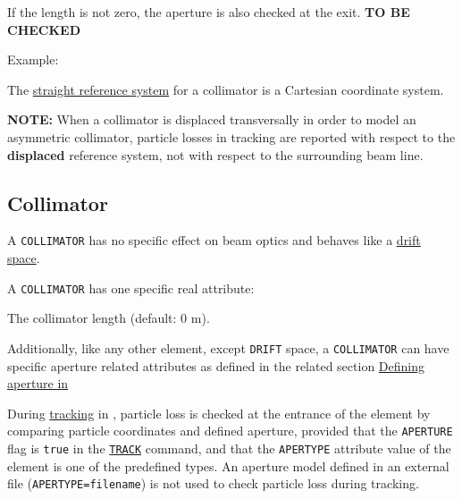 {\begin{5.02.04}
If the length is not zero, the aperture is also checked at the
exit. \textbf{ TO BE CHECKED } 

Example: 

The \hyperref[subsec:local_straight]{straight reference system} for a
collimator is a Cartesian coordinate system.  

\textbf{NOTE:} When a collimator is displaced transversally in order to
model an asymmetric collimator, particle losses in tracking are
reported with respect to the \textbf{displaced} reference system, not
with respect to the surrounding beam line.

\end{5.02.04}

\begin{5.02.05}
\section{Collimator}
\label{sec:collimator}

A {\tt COLLIMATOR} has no specific effect on beam optics and behaves like a
\hyperref[sec:drift]{drift space}. 



A {\tt COLLIMATOR} has one specific real attribute: 
\begin{madlist}
	 The collimator length (default: 0 m). 
\end{madlist}

Additionally, like any other element, except {\tt DRIFT} space, 
a {\tt COLLIMATOR} can have specific aperture related attributes 
as defined in the related section \hyperref[sec:def_aper]{Defining 
aperture in \madx}


During \hyperref[chap:thin_track]{tracking} in \madx, particle loss 
is checked at the entrance of the element by comparing particle coordinates 
and defined aperture, provided that the {\tt APERTURE} flag is {\tt true} 
in the \hyperref[sec:track]{\tt TRACK} command, 
and that the {\tt APERTYPE} attribute value of the element is one of the 
predefined types. 
An aperture model defined in an external file ({\tt APERTYPE=filename})
is not used to check particle loss during tracking. 



\end{5.02.05}}
